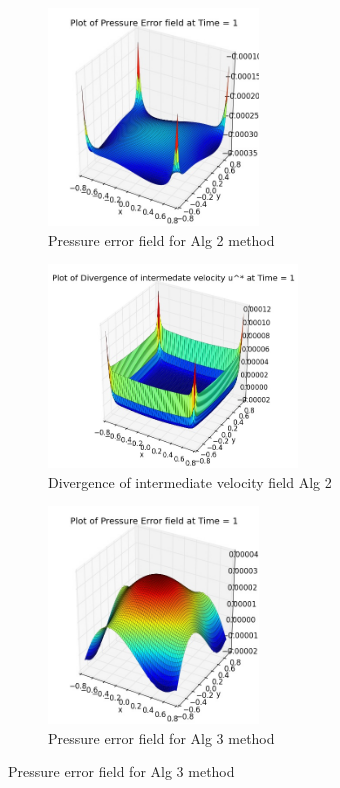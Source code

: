 \begin{figure}[H]
	\centering
	\begin{subfigure}[t]{2.2in}
		\centering
		\includegraphics[width=2.2in]{figures/Pm1b_unf1_np_P_error_t_1_grid_60.jpg}
		\caption{Pressure error field for Alg 2 method}\label{fig:6.19a}		
	\end{subfigure}
	\quad
	\begin{subfigure}[t]{2.6in}
		\centering
		\includegraphics[width=2.6in]{figures/Pm1b_unf1_np_div_uvstar_t_1_grid_60.jpg}
		\caption{Divergence of intermediate velocity field Alg 2}\label{fig:6.19b}
	\end{subfigure}
	\quad
	\centering
	\begin{subfigure}[t]{2.2in}
		\centering
		\includegraphics[width=2.2in]{figures/Pm2_unf1_np_P_error_t_1_grid_60.jpg}
		\caption{Pressure error field for Alg 3 method}\label{fig:6.19a}		
	\end{subfigure}

\end{figure}
